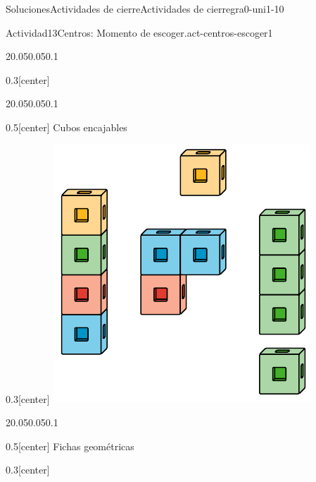 \documentclass[twoside,10pt,]{article}
\begin{document}
\begin{solutions-section}{Soluciones}{Actividades de cierre}{}{Actividades de cierre}{}{}{gra0-uni1-10}
\begin{activitysolution}{Actividad}{13}{Centros: Momento de escoger.}{act-centros-escoger1}
\begin{sidebyside}{2}{0.05}{0.05}{0.1}
\begin{sbspanel}{0.3}[center]
\end{sbspanel}%
\end{sidebyside}%
\begin{sidebyside}{2}{0.05}{0.05}{0.1}%
\begin{sbspanel}{0.5}[center]%
Cubos encajables%
\end{sbspanel}%
\begin{sbspanel}{0.3}[center]%
\includegraphics[width=\linewidth]{external/svg-source/tikz-file-128850.pdf}
\end{sbspanel}%
\end{sidebyside}%
\begin{sidebyside}{2}{0.05}{0.05}{0.1}%
\begin{sbspanel}{0.5}[center]%
Fichas geométricas%
\end{sbspanel}%
\begin{sbspanel}{0.3}[center]%

\end{sbspanel}
\end{sidebyside}
\end{activitysolution}
\end{solutions-section}
\end{document}
